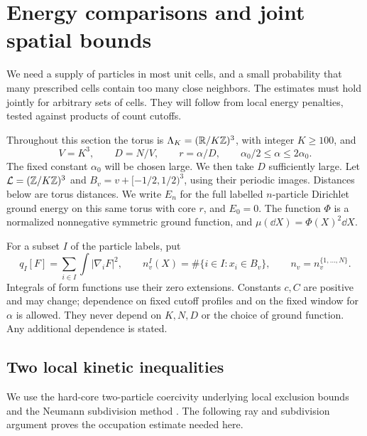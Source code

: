 \section{Energy comparisons and joint spatial bounds}\label{sp:section}

We need a supply of particles in most unit cells, and a small probability
that many prescribed cells contain too many close neighbors.  The estimates
must hold jointly for arbitrary sets of cells.  They will follow from local
energy penalties, tested against products of count cutoffs.

Throughout this section the torus is $\Lambda_K=(\mathbb R/K\mathbb Z)^3$, with integer
$K\ge100$, and
\[
 V=K^3,\qquad D=N/V,\qquad r=\alpha/D,
 \qquad \alpha_0/2\le\alpha\le2\alpha_0.
\]
The fixed constant $\alpha_0$ will be chosen large.  We then take $D$
sufficiently large.  Let $\mathcal L=(\mathbb Z/K\mathbb Z)^3$ and
$B_v=v+[-1/2,1/2)^3$, using their periodic images.  Distances below are torus
distances.  We write $E_n$ for the full labelled $n$-particle Dirichlet
ground energy on this same torus with core $r$, and $E_0=0$.
The function $\Phi$ is a normalized nonnegative symmetric ground function,
and $\mu(\dd X)=\Phi(X)^2\dd X$.

For a subset $I$ of the particle labels, put
\[
 q_I[F]=\sum_{i\in I}\int |\nabla_iF|^2,
 \qquad n_v^I(X)=\#\{i\in I:x_i\in B_v\},\qquad n_v=n_v^{\{1,\ldots,N\}}.
\]
Integrals of form functions use their zero extensions.  Constants $c,C$
are positive and may change; dependence on fixed cutoff profiles and on
the fixed window for $\alpha$ is allowed.  They never depend on $K,N,D$ or
the choice of ground function.  Any additional dependence is stated.

\subsection{Two local kinetic inequalities}

We use the hard-core two-particle coercivity underlying local exclusion
bounds \cite[Proposition~10]{LundholmPortmannSolovej2015} and the Neumann
subdivision method \cite{LiebYngvason1998}. The following ray and
subdivision argument proves the occupation estimate needed here.

